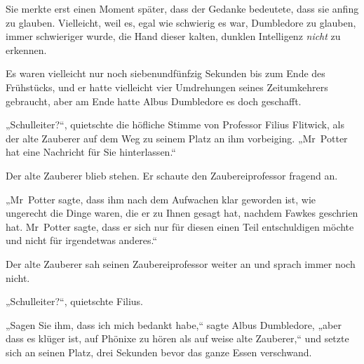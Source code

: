 Sie merkte erst einen Moment später, dass der Gedanke bedeutete, dass sie anfing zu glauben. Vielleicht, weil es, egal wie schwierig es war, Dumbledore zu glauben, immer schwieriger wurde, die Hand dieser kalten, dunklen Intelligenz \emph{nicht} zu erkennen.


Es waren vielleicht nur noch siebenundfünfzig Sekunden bis zum Ende des Frühstücks, und er hatte vielleicht vier Umdrehungen seines Zeitumkehrers gebraucht, aber am Ende hatte Albus Dumbledore es doch geschafft.

„Schulleiter?“, quietschte die höfliche Stimme von Professor Filius Flitwick, als der alte Zauberer auf dem Weg zu seinem Platz an ihm vorbeiging. „Mr~Potter hat eine Nachricht für Sie hinterlassen.“

Der alte Zauberer blieb stehen. Er schaute den Zaubereiprofessor fragend an.

„Mr~Potter sagte, dass ihm nach dem Aufwachen klar geworden ist, wie ungerecht die Dinge waren, die er zu Ihnen gesagt hat, nachdem Fawkes geschrien hat. Mr~Potter sagte, dass er sich nur für diesen einen Teil entschuldigen möchte und nicht für irgendetwas anderes.“

Der alte Zauberer sah seinen Zaubereiprofessor weiter an und sprach immer noch nicht.

„Schulleiter?“, quietschte Filius.

„Sagen Sie ihm, dass ich mich bedankt habe,“ sagte Albus Dumbledore, „aber dass es klüger ist, auf Phönixe zu hören als auf weise alte Zauberer,“ und setzte sich an seinen Platz, drei Sekunden bevor das ganze Essen verschwand.

